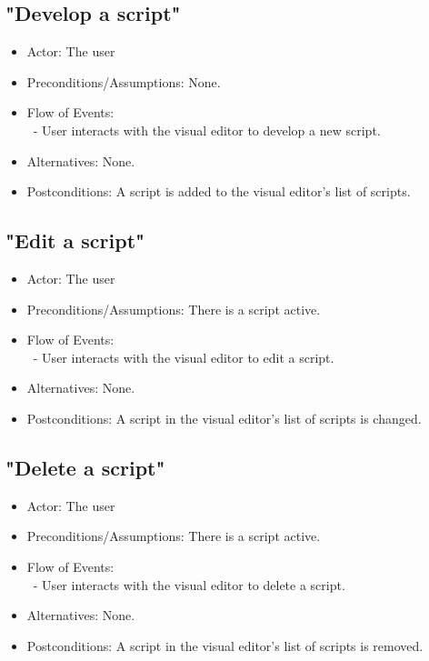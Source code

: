 \documentclass[12pt]{article}
\begin{document}
	\subsection{"Develop a script"}
\begin{itemize}
		\item Actor: The user
		\item Preconditions/Assumptions: None.
	\item Flow of Events: \\
	\	- User interacts with the visual editor to develop a new script.
	\item Alternatives: None.
	\item Postconditions: A script is added to the visual editor's list of scripts.
\end{itemize}

	\subsection{"Edit a script"}
\begin{itemize}
		\item Actor: The user
		\item Preconditions/Assumptions: There is a script active.
	\item Flow of Events: \\
	\	- User interacts with the visual editor to edit a script.
	\item Alternatives: None.
	\item Postconditions: A script in the visual editor's list of scripts is changed.
\end{itemize}

	\subsection{"Delete a script"}
\begin{itemize}
		\item Actor: The user
		\item Preconditions/Assumptions: There is a script active.
	\item Flow of Events: \\
	\	- User interacts with the visual editor to delete a script.
	\item Alternatives: None.
	\item Postconditions: A script in the visual editor's list of scripts is removed.
\end{itemize}
	
\end{document}
